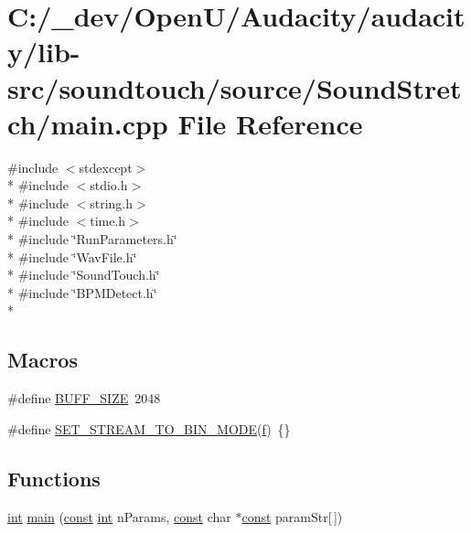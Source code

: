 \hypertarget{lib-src_2soundtouch_2source_2_sound_stretch_2main_8cpp}{}\section{C\+:/\+\_\+dev/\+Open\+U/\+Audacity/audacity/lib-\/src/soundtouch/source/\+Sound\+Stretch/main.cpp File Reference}
\label{lib-src_2soundtouch_2source_2_sound_stretch_2main_8cpp}
{\ttfamily \#include $<$stdexcept$>$}\\*
{\ttfamily \#include $<$stdio.\+h$>$}\\*
{\ttfamily \#include $<$string.\+h$>$}\\*
{\ttfamily \#include $<$time.\+h$>$}\\*
{\ttfamily \#include \char`\"{}Run\+Parameters.\+h\char`\"{}}\\*
{\ttfamily \#include \char`\"{}Wav\+File.\+h\char`\"{}}\\*
{\ttfamily \#include \char`\"{}Sound\+Touch.\+h\char`\"{}}\\*
{\ttfamily \#include \char`\"{}B\+P\+M\+Detect.\+h\char`\"{}}\\*
\subsection*{Macros}
\begin{DoxyCompactItemize}
\item 
\#define \hyperlink{lib-src_2soundtouch_2source_2_sound_stretch_2main_8cpp_a6c7cd32e1bac137f05e4a752b4ad10af}{B\+U\+F\+F\+\_\+\+S\+I\+ZE}~2048
\item 
\#define \hyperlink{lib-src_2soundtouch_2source_2_sound_stretch_2main_8cpp_ab203885ddcb017a457ebe87badb7a541}{S\+E\+T\+\_\+\+S\+T\+R\+E\+A\+M\+\_\+\+T\+O\+\_\+\+B\+I\+N\+\_\+\+M\+O\+DE}(\hyperlink{checksum_8c_ae747d72a1a803f5ff4a4b2602857d93b}{f})~\{\}
\end{DoxyCompactItemize}
\subsection*{Functions}
\begin{DoxyCompactItemize}
\item 
\hyperlink{xmltok_8h_a5a0d4a5641ce434f1d23533f2b2e6653}{int} \hyperlink{lib-src_2soundtouch_2source_2_sound_stretch_2main_8cpp_ac643b460385bf6027048c170162b5be6}{main} (\hyperlink{getopt1_8c_a2c212835823e3c54a8ab6d95c652660e}{const} \hyperlink{xmltok_8h_a5a0d4a5641ce434f1d23533f2b2e6653}{int} n\+Params, \hyperlink{getopt1_8c_a2c212835823e3c54a8ab6d95c652660e}{const} char $\ast$\hyperlink{getopt1_8c_a2c212835823e3c54a8ab6d95c652660e}{const} param\+Str\mbox{[}$\,$\mbox{]})
\end{DoxyCompactItemize}


